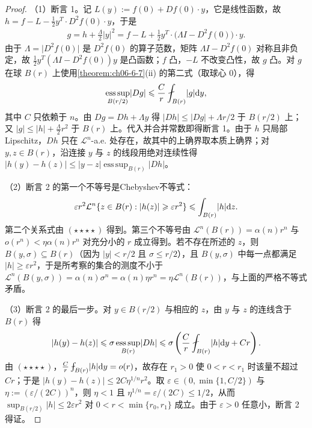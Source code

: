 \documentclass[../../main.tex]{subfiles}%
\begin{document}
\begin{proof}
（1）断言 1。记 $L(y):=f(0)+Df(0)\cdot y$，它是线性函数，故 $h=f-L-\frac{1}{2}y^{T}\cdot D^{2}f(0)\cdot y$，于是
\begin{align*}
g=h+\frac{\Lambda}{2}\lvert y\rvert^{2}=f-L+\frac{1}{2}y^{T}\cdot\bigl(\Lambda I-D^{2}f(0)\bigr)\cdot y.
\end{align*}
由于 $\Lambda=\lvert D^{2}f(0)\rvert$ 是 $D^{2}f(0)$ 的算子范数，矩阵 $\Lambda I-D^{2}f(0)$ 对称且非负定，故 $\frac{1}{2}y^{T}(\Lambda I-D^{2}f(0))y$ 是凸函数；$f$ 凸，$-L$ 不改变凸性，故 $g$ 凸。对 $g$ 在球 $B(r)$ 上使用\cref{theorem:ch06-6-7}(ii) 的第二式（取球心 $0$），得%
\begin{align*}
\operatorname*{ess\,sup}_{B(r/2)}\lvert Dg\rvert\leqslant\frac{C}{r}\fint_{B(r)}\lvert g\rvert\diff y,
\end{align*}
其中 $C$ 只依赖于 $n$。由 $Dg=Dh+\Lambda y$ 得 $\lvert Dh\rvert\leqslant\lvert Dg\rvert+\Lambda r/2$ 于 $B(r/2)$ 上；又 $\lvert g\rvert\leqslant\lvert h\rvert+\frac{\Lambda}{2}r^{2}$ 于 $B(r)$ 上。代入并合并常数即得断言 1。由于 $h$ 只局部 Lipschitz，$Dh$ 只在 $\mathcal{L}^{n}$-a.e. 处存在，故其中的上确界取本质上确界；对 $y,z\in B(r)$，沿连接 $y$ 与 $z$ 的线段用绝对连续性得 $\lvert h(y)-h(z)\rvert\leqslant\lvert y-z\rvert\operatorname*{ess\,sup}_{B(r)}\lvert Dh\rvert$。

（2）断言 2 的第一个不等号是Chebyshev不等式：
\begin{align*}
\varepsilon r^{2}\mathcal{L}^{n}\{z\in B(r):\lvert h(z)\rvert\geqslant\varepsilon r^{2}\}\leqslant\int_{B(r)}\lvert h\rvert\mathrm{d} z.
\end{align*}
第二个关系式由 $(\star\star\star\star)$ 得到。第三个不等号由 $\mathcal{L}^{n}(B(r))=\alpha(n)r^{n}$ 与 $o(r^{n})<\eta\alpha(n)r^{n}$ 对充分小的 $r$ 成立得到。若不存在所述的 $z$，则 $B(y,\sigma)\subseteq B(r)$（因为 $\lvert y\rvert<r/2$ 且 $\sigma\leqslant r/2$），且 $B(y,\sigma)$ 中每一点都满足 $\lvert h\rvert\geqslant\varepsilon r^{2}$，于是所考察的集合的测度不小于 $\mathcal{L}^{n}(B(y,\sigma))=\alpha(n)\sigma^{n}=\alpha(n)\eta r^{n}=\eta\mathcal{L}^{n}(B(r))$，与上面的严格不等式矛盾。

（3）断言 2 的最后一步。对 $y\in B(r/2)$ 与相应的 $z$，由 $y$ 与 $z$ 的连线含于 $B(r)$ 得
\begin{align*}
\lvert h(y)-h(z)\rvert\leqslant\sigma\operatorname*{ess\,sup}_{B(r)}\lvert Dh\rvert\leqslant\sigma\left(\frac{C}{r}\fint_{B(r)}\lvert h\rvert\diff y+Cr\right).
\end{align*}
由 $(\star\star\star\star)$，$\frac{C}{r}\fint_{B(r)}\lvert h\rvert\diff y=o(r)$，故存在 $r_{1}>0$ 使 $0<r<r_{1}$ 时该量不超过 $Cr$；于是 $\lvert h(y)-h(z)\rvert\leqslant2C\eta^{1/n}r^{2}$。取 $\varepsilon\in(0,\min\{1,C/2\})$ 与 $\eta:=(\varepsilon/(2C))^{n}$，则 $\eta<1$ 且 $\eta^{1/n}=\varepsilon/(2C)\leqslant1/2$，从而 $\sup_{B(r/2)}\lvert h\rvert\leqslant2\varepsilon r^{2}$ 对 $0<r<\min\{r_{0},r_{1}\}$ 成立。由于 $\varepsilon>0$ 任意小，断言 2 得证。


\end{proof}
\end{document}
